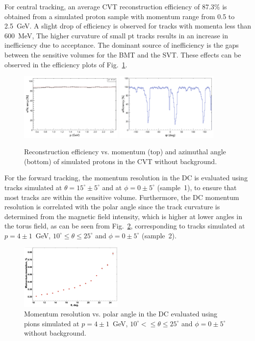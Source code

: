 For central tracking, an average CVT reconstruction efficiency of 87.3\% is obtained from a simulated proton sample with
momentum range from 0.5 to 2.5~GeV. A slight drop of efficiency is observed for tracks with momenta less than 600~MeV, 
The higher curvature of small pt tracks results in an increase in inefficiency due to acceptance.  
The dominant source of inefficiency is the gaps between the sensitive volumes for the BMT and the SVT.  These effects can be observed in the efficiency plots of Fig.~\ref{fig:cvtpeff}.

\begin{figure}[h]
\includegraphics[width=0.45\textwidth]{pics/CVTPEff.png}
\includegraphics[width=0.45\textwidth]{pics/CVTPhiEff.png}
\caption{Reconstruction efficiency vs. momentum (top) and azimuthal angle (bottom) of simulated protons in the CVT without background.}
\label{fig:cvtpeff}
\end{figure}

For the forward tracking, the momentum resolution in the DC is evaluated using tracks simulated at
$\theta =15^\circ \pm 5^\circ$ and at $\phi = 0 \pm 5^\circ$ (sample~1), to ensure that most tracks are within the
sensitive volume. Furthermore, the DC momentum resolution is correlated with the polar angle since the track
curvature is determined from the magnetic field intensity, which is higher at lower angles in the torus field, as can
be seen from Fig.~\ref{fig:restheta}, corresponding to tracks simulated at $p=4\pm 1$~GeV,
$10^\circ \leq \theta \leq 25^\circ$ and $\phi = 0 \pm 5^\circ$ (sample~2).

\begin{figure}
\includegraphics[width=0.45\textwidth]{pics/DCRes2.png}
\caption{Momentum resolution vs. polar angle in the DC evaluated using pions simulated at $p=4\pm 1$~GeV,
  $10^\circ <\leq \theta \leq 25^\circ$ and $\phi = 0 \pm 5^\circ$ without background.}
\label{fig:restheta}
\end{figure}

